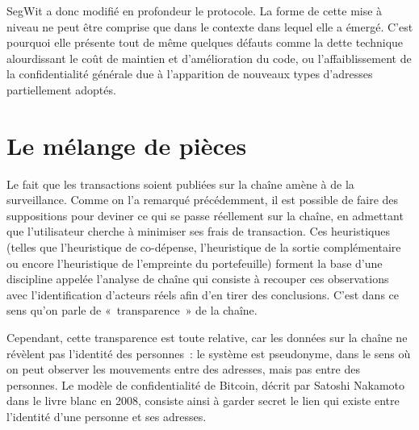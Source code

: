 

SegWit a donc modifié en profondeur le protocole. La forme de cette mise à niveau ne peut être comprise que dans le contexte dans lequel elle a émergé. C'est pourquoi elle présente tout de même quelques défauts comme la dette technique alourdissant le coût de maintien et d'amélioration du code, ou l'affaiblissement de la confidentialité générale due à l'apparition de nouveaux types d'adresses partiellement adoptés.

\section*{Le mélange de pièces}

Le fait que les transactions soient publiées sur la chaîne amène à de la surveillance. Comme on l'a remarqué précédemment, il est possible de faire des suppositions pour deviner ce qui se passe réellement sur la chaîne, en admettant que l'utilisateur cherche à minimiser ses frais de transaction. Ces heuristiques (telles que l'heuristique de co-dépense, l'heuristique de la sortie complémentaire ou encore l'heuristique de l'empreinte du portefeuille) forment la base d'une discipline appelée l'analyse de chaîne qui consiste à recouper ces observations avec l'identification d'acteurs réels afin d'en tirer des conclusions. C'est dans ce sens qu'on parle de «~transparence~» de la chaîne. %

Cependant, cette transparence est toute relative, car les données sur la chaîne ne révèlent pas l'identité des personnes~: le système est pseudonyme, dans le sens où on peut observer les mouvements entre des adresses, mais pas entre des personnes. Le modèle de confidentialité de Bitcoin, décrit par Satoshi Nakamoto dans le livre blanc en 2008, consiste ainsi à garder secret le lien qui existe entre l'identité d'une personne et ses adresses.

